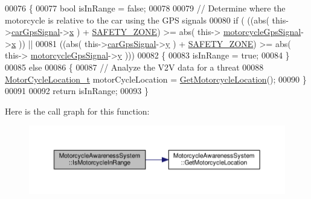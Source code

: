 \begin{DoxyCode}
00076 \{
00077     \textcolor{keywordtype}{bool} isInRange = \textcolor{keyword}{false};
00078 
00079     \textcolor{comment}{// Determine where the motorcycle is relative to the car using the GPS signals}
00080     \textcolor{keywordflow}{if} ( ((abs( this->\hyperlink{classMotorcycleAwarenessSystem_a9a8185e00b60d0be58bfa76166063128}{carGpsSignal}->\hyperlink{structGpsSignal__t_a6f7bd3c500b55923ab335ada4b6b26eb}{x} ) + \hyperlink{classMotorcycleAwarenessSystem_a131c99d85b78020f94fe14bd397f3a6e}{SAFETY\_ZONE}) >= abs( this->
      \hyperlink{classMotorcycleAwarenessSystem_ab281a3993b574923b2f379ed0477b2d4}{motorcycleGpsSignal}->\hyperlink{structGpsSignal__t_a6f7bd3c500b55923ab335ada4b6b26eb}{x} )) ||
00081          ((abs( this->\hyperlink{classMotorcycleAwarenessSystem_a9a8185e00b60d0be58bfa76166063128}{carGpsSignal}->\hyperlink{structGpsSignal__t_ab9e083be189fc842ed7aa4fdc978e94e}{y} ) + \hyperlink{classMotorcycleAwarenessSystem_a131c99d85b78020f94fe14bd397f3a6e}{SAFETY\_ZONE}) >= abs( this->
      \hyperlink{classMotorcycleAwarenessSystem_ab281a3993b574923b2f379ed0477b2d4}{motorcycleGpsSignal}->\hyperlink{structGpsSignal__t_ab9e083be189fc842ed7aa4fdc978e94e}{y} )))
00082     \{
00083         isInRange = \textcolor{keyword}{true};
00084     \}
00085     \textcolor{keywordflow}{else}
00086     \{
00087         \textcolor{comment}{// Analyze the V2V data for a threat}
00088         \hyperlink{structMotorCycleLocation__t}{MotorCycleLocation\_t} motorCycleLocation = 
      \hyperlink{classMotorcycleAwarenessSystem_a840a5bc17d75276ecdb3a39d7aaf4109}{GetMotorcycleLocation}();
00090     \}
00091 
00092     \textcolor{keywordflow}{return} isInRange;
00093 \}
\end{DoxyCode}


Here is the call graph for this function\-:\nopagebreak
\begin{figure}[H]
\begin{center}
\leavevmode
\includegraphics[width=350pt]{classMotorcycleAwarenessSystem_a239655aca9c875b1dbbad3ce155c7892_cgraph}
\end{center}
\end{figure}




